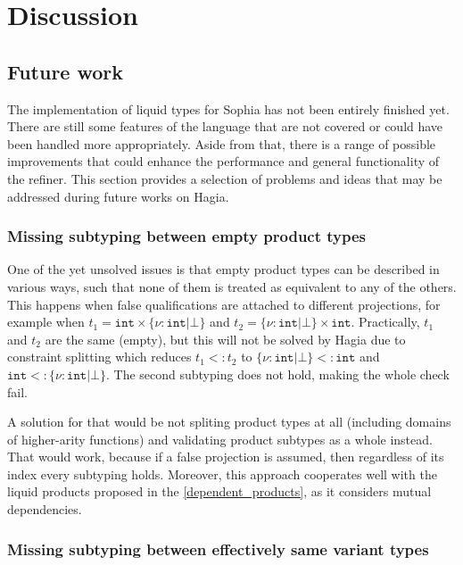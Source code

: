 \chapter{Discussion}

\section{Future work}

The implementation of liquid types for Sophia has not been entirely finished
yet. There are still some features of the language that are not covered or could
have been handled more appropriately. Aside from that, there is a range of
possible improvements that could enhance the performance and general
functionality of the refiner. This section provides a selection of problems and
ideas that may be addressed during future works on Hagia.

\subsection{Missing subtyping between empty product types}
\label{empty_tuples}

One of the yet unsolved issues is that empty product types can be described in
various ways, such that none of them is treated as equivalent to any of the
others. This happens when false qualifications are attached to different
projections, for example when $t_1 = \texttt{int} \times \{\nu : \texttt{int} |
\bot\}$ and $t_2 = \{\nu : \texttt{int} | \bot\} \times \texttt{int}$.
Practically, $t_1$ and $t_2$ are the same (empty), but this will not be solved
by Hagia due to constraint splitting which reduces $t_1 <: t_2$ to $\{\nu :
\texttt{int} | \bot\} <: \texttt{int}$ and $\texttt{int} <: \{\nu : \texttt{int}
| \bot\}$. The second subtyping does not hold, making the whole check fail.

A solution for that would be not spliting product types at all (including
domains of higher-arity functions) and validating product subtypes as a whole
instead. That would work, because if a false projection is assumed, then
regardless of its index every subtyping holds. Moreover, this approach
cooperates well with the liquid products proposed in the
\autoref{dependent_products}, as it considers mutual dependencies.

\subsection{Missing subtyping between effectively same variant types}
\label{effective_variant_types}

